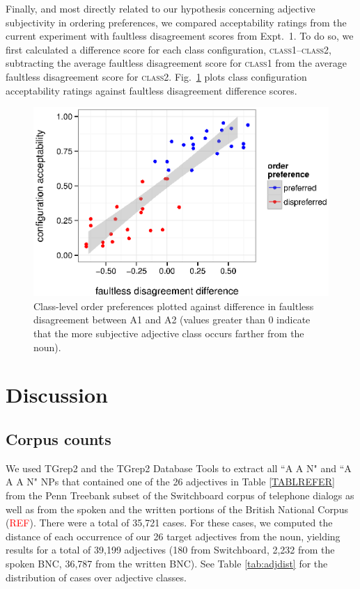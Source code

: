 \documentclass{pnastwo}
\newcommand{\tableref}[1]{Table \ref{#1}}
\newcommand{\red}[1]{\textcolor{Red}{#1}}
\begin{document}
\begin{article}
Finally, and most directly related to our hypothesis concerning adjective subjectivity in ordering preferences, we compared acceptability ratings from the current experiment with faultless disagreement scores from Expt.\ 1. To do so, we first calculated a difference score for each class configuration, \textsc{class1}--\textsc{class2}, subtracting the average faultless disagreement score for \textsc{class1} from the average faultless disagreement score for \textsc{class2}. Fig.\ \ref{faultless-order} plots class configuration acceptability ratings against faultless disagreement difference scores.

\begin{figure}[h]
	\centering
	\includegraphics[width=\linewidth]{plots/faultless_order_preference.eps}
	\caption{Class-level order preferences plotted against difference in faultless disagreement between A1 and A2 (values greater than 0 indicate that the more subjective adjective class occurs farther from the noun).}\label{faultless-order}
\end{figure}






\section{Discussion}



\begin{materials}
\section{Corpus counts} 

We used TGrep2 \cite{rohde2005} and the TGrep2 Database Tools \cite{degenjaeger-tdt} to extract all ``A A N" and ``A A A N" NPs that contained one of the 26 adjectives in Table \ref{TABLREFER} from the Penn Treebank subset of the Switchboard corpus of telephone dialogs \cite{godfrey1992} as well as from the spoken and the written portions of the British National Corpus (\red{REF}). There were a total of 35,721 cases. For these cases, we computed the distance of each occurrence of our 26 target adjectives from the noun, yielding results for a total of 39,199 adjectives (180 from Switchboard, 2,232 from the spoken BNC, 36,787 from the written BNC).  See \tableref{tab:adjdist} for the distribution of cases over adjective classes.


\end{materials}
\end{article}
\end{document}
